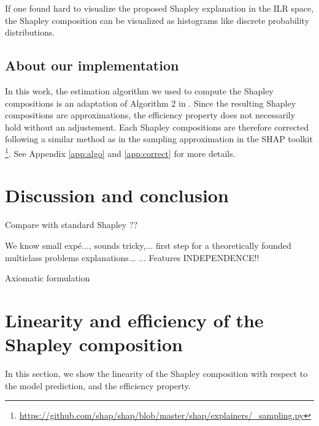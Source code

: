 \documentclass{article}
\theoremstyle{plain}
\theoremstyle{definition}
\theoremstyle{remark}
\begin{document}
If one found hard to visualize the proposed Shapley explanation in the ILR space, the Shapley composition can be visualized as histograms like discrete probability distributions.

\subsection{About our implementation}

In this work, the estimation algorithm we used to compute the Shapley compositions is an adaptation of Algorithm 2 in \cite{vstrumbelj2014explaining}. Since the resulting Shapley compositions are approximations, the efficiency property does not necessarily hold without an adjustement. Each Shapley compositions are therefore corrected following a similar method as in the sampling approximation in the SHAP toolkit \cite{NIPS2017_7062}\footnote{\url{https://github.com/shap/shap/blob/master/shap/explainers/_sampling.py}}. See Appendix \ref{app:algo} and \ref{app:correct} for more details.

\section{Discussion and conclusion}

Compare with standard Shapley ??

We know small expé..., sounds tricky,... first step for a theoretically founded multiclass problems explanations...
...
Features INDEPENDENCE!!

Axiomatic formulation


\nocite{langley00}





\newpage
\appendix
\onecolumn

\section{Linearity and efficiency of the Shapley composition}
\label{app:properties}
In this section, we show the linearity of the Shapley composition with respect to the model prediction, and the efficiency property.
\end{document}
